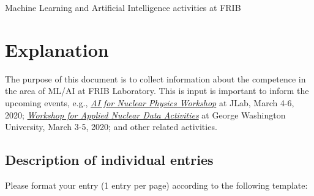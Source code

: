 \documentclass[%
10pt]{article}
\begin{document}
\thispagestyle{empty}

\begin{center}
{\LARGE\bf
\begin{spacing}{1.25}
Machine Learning and Artificial Intelligence activities at FRIB
\end{spacing}
}
\end{center}

\tableofcontents
\newpage

\section{Explanation}


The purpose of this document is to collect information about the  competence  in the area of ML/AI at FRIB Laboratory. This is input is important to inform the upcoming events, e.g.,  \href{https://www.jlab.org/conference/AI2020}{\it AI for Nuclear Physics Workshop} at JLab, March 4-6, 2020; \href{https://conferences.lbl.gov/event/292/}{\it Workshop for Applied Nuclear Data Activities} at George Washington University, March 3-5, 2020;
and other related  activities.


\subsection{Description of individual entries}
Please format your entry (1 entry per page) according to the following template:

\vspace{5mm}
\noindent
{}
\end{document}
